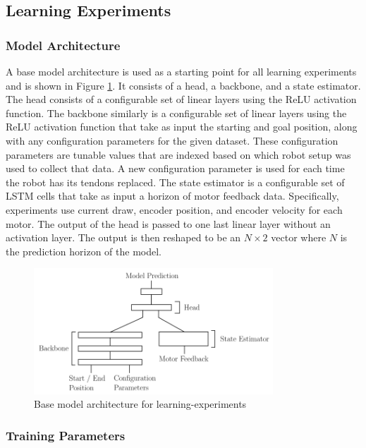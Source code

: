 \subsection{Learning Experiments}

\subsubsection{Model Architecture}

A base model architecture is used as a starting point for all learning experiments and is shown in Figure \ref{fig:architecture}. It consists of a head, a backbone, and a state estimator. The head consists of a configurable set of linear layers using the ReLU activation function. The backbone similarly is a configurable set of linear layers using the ReLU activation function that take as input the starting and goal position, along with any configuration parameters for the given dataset. These configuration parameters are tunable values that are indexed based on which robot setup was used to collect that data. A new configuration parameter is used for each time the robot has its tendons replaced. The state estimator is a configurable set of LSTM cells that take as input a horizon of motor feedback data. Specifically, experiments use current draw, encoder position, and encoder velocity for each motor. The output of the head is passed to one last linear layer without an activation layer. The output is then reshaped to be an $N\times 2$ vector where $N$ is the prediction horizon of the model. 

\begin{figure}[h]
    \centering
    \includegraphics[width=0.8\textwidth]{images/architecture.png}
    \caption{Base model architecture for learning-experiments}
    \label{fig:architecture}
\end{figure}


\subsubsection{Training Parameters}
\label{sec:learning_baseline_description}

